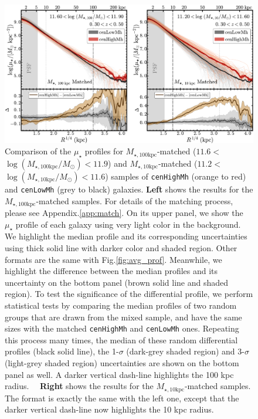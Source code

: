 \documentclass{emulateapj}
\def\rbcg{\texttt{cenHighMh}}
\def\nbcg{\texttt{cenLowMh}}
\def\minn{{$M_{\star,10\mathrm{kpc}}$}}
\def\mtot{{$M_{\star,100\mathrm{kpc}}$}}
\def\logminn{{$\log (M_{\star,10\mathrm{kpc}}/M_{\odot})$}}
\def\logmtot{{$\log (M_{\star,100\mathrm{kpc}}/M_{\odot})$}}
\def\mden{{$\mu_{\star}$}}
\newcommand{\update}[1]{\textcolor{Bittersweet}{#1}}
\begin{document}
\begin{CJK*}{UTF8}{gbsn}
  \begin{figure}[t!]
      \centering 
      \includegraphics[width=\textwidth]{fig/redbcg_prof_1}
      \update{
      Comparison of the \mden{} profiles for \mtot{}-matched ($11.6<$\logmtot{}$<11.9$) 
      and \minn{}-matched ($11.2<$\logminn{}$<11.6$) samples 
      of \rbcg{} (orange to red) and \nbcg{} (grey to black) galaxies.
      \textbf{Left} shows the results for the \mtot{}-matched samples.
      For details of the matching process, please see Appendix.\ref{app:match}.  
      On its upper panel, we show the \mden{} profile of each galaxy using very light 
      color in the background.  
      We highlight the median profile and its corresponding uncertainties using thick 
      solid line with darker color and shaded region. 
      Other formats are the same with Fig.\ref{fig:avg_prof}.
      Meanwhile, we highlight the difference between the median profiles and its 
      uncertainty on the bottom panel (brown solid line and shaded region).
      To test the significance of the differential profile, we perform statistical tests 
      by comparing the median profiles of two random groups that are drawn from the 
      mixed sample, and have the same sizes with the matched \rbcg{} and \nbcg{} ones.
      Repeating this process many times, the median of these random differential 
      profiles (black solid line), the 1-$\sigma$ (dark-grey shaded region) and 3-$\sigma$
      (light-grey shaded region) uncertainties are shown on the bottom panel as well. 
      A darker vertical dash-line highlights the 100 kpc radius.~~
      \textbf{Right} shows the results for the \minn{}-matched samples. 
      The format is exactly the same with the left one, except that the darker vertical 
      dash-line now highlights the 10 kpc radius.}
      \label{fig:prof_m100_A}
  \end{figure}


\end{CJK*}
\end{document}
